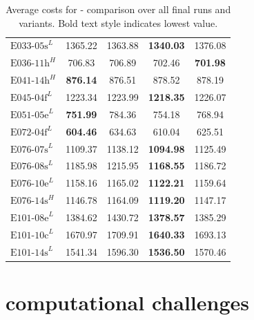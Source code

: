 \begin{table}
\begin{tabular}{lcccc}
		$\text{E033-05s}^L$ & 1365.22                     & 1363.88         & \textbf{1340.03} & 1376.08         \\
		$\text{E036-11h}^H$ & 706.83                      & 706.89          & 702.46           & \textbf{701.98} \\
		$\text{E041-14h}^H$ & \textbf{876.14}             & 876.51          & 878.52           & 878.19          \\
		$\text{E045-04f}^L$ & 1223.34                     & 1223.99         & \textbf{1218.35} & 1226.07         \\
		$\text{E051-05e}^L$ & \textbf{751.99}             & 784.36          & 754.18           & 768.94          \\
		$\text{E072-04f}^L$ & \textbf{604.46}             & 634.63          & 610.04           & 625.51          \\
		$\text{E076-07s}^L$ & 1109.37                     & 1138.12         & \textbf{1094.98} & 1125.49         \\
		$\text{E076-08s}^L$ & 1185.98                     & 1215.95         & \textbf{1168.55} & 1186.72         \\
		$\text{E076-10e}^L$ & 1158.16                     & 1165.02         & \textbf{1122.21} & 1159.64         \\
		$\text{E076-14s}^H$ & 1146.78                     & 1164.09         & \textbf{1119.20} & 1147.17         \\
		$\text{E101-08e}^L$ & 1384.62                     & 1430.72         & \textbf{1378.57} & 1385.29         \\
		$\text{E101-10c}^L$ & 1670.97                     & 1709.91         & \textbf{1640.33} & 1693.13         \\
		$\text{E101-14s}^L$ & 1541.34                     & 1596.30         & \textbf{1536.50} & 1570.46         \\
		\bottomrule
	\end{tabular}
	\caption[Average costs for \gendreauDataSetText - comparison over all final runs and variants.]
	{Average costs for \gendreauDataSetText - comparison over all final runs and variants. Bold text style indicates lowest value.}
	\label{tab:final_mean_comparison}
\end{table}
\clearpage
\section{\krebsADataSetText computational challenges}
\label{app:sec:krebs_computationally_challenges}

